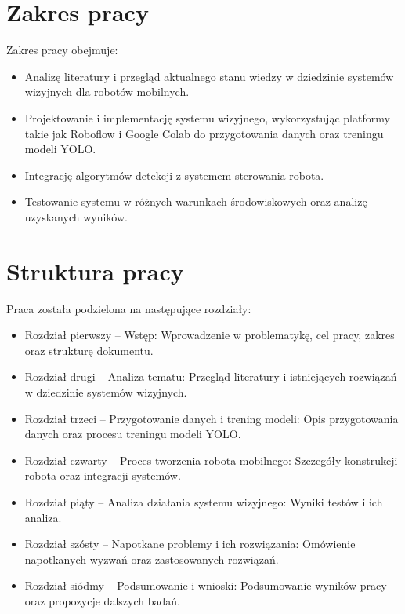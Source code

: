 \documentclass[a4paper,twoside,12pt]{book}
\begin{document}
\newpage
\section{Zakres pracy}

Zakres pracy obejmuje:
\begin{itemize}
    \item Analizę literatury i przegląd aktualnego stanu wiedzy w dziedzinie systemów wizyjnych dla robotów mobilnych.
    \item Projektowanie i implementację systemu wizyjnego, wykorzystując platformy takie jak Roboflow i Google Colab do przygotowania danych oraz treningu modeli YOLO.
    \item Integrację algorytmów detekcji z systemem sterowania robota.
    \item Testowanie systemu w różnych warunkach środowiskowych oraz analizę uzyskanych wyników.
\end{itemize}

\section{Struktura pracy}

Praca została podzielona na następujące rozdziały:
\begin{itemize}
    \item Rozdział pierwszy – Wstęp: Wprowadzenie w problematykę, cel pracy, zakres oraz strukturę dokumentu.
    \item Rozdział drugi – Analiza tematu: Przegląd literatury i istniejących rozwiązań w dziedzinie systemów wizyjnych.
    \item Rozdział trzeci – Przygotowanie danych i trening modeli: Opis przygotowania danych oraz procesu treningu modeli YOLO.
    \item Rozdział czwarty – Proces tworzenia robota mobilnego: Szczegóły konstrukcji robota oraz integracji systemów.
    \item Rozdział piąty – Analiza działania systemu wizyjnego: Wyniki testów i ich analiza.
    \item Rozdział szósty – Napotkane problemy i ich rozwiązania: Omówienie napotkanych wyzwań oraz zastosowanych rozwiązań.
    \item Rozdział siódmy – Podsumowanie i wnioski: Podsumowanie wyników pracy oraz propozycje dalszych badań.
\end{itemize}

\newpage
\end{document}
